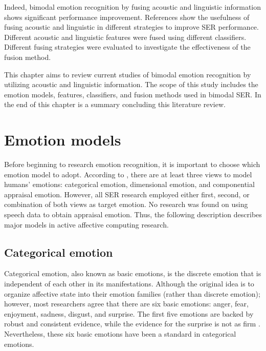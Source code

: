 Indeed, bimodal emotion recognition by fusing acoustic and linguistic
information shows significant performance improvement. References
\cite{Schuller2004,Schullera,Eyben2010,Ye2014,Tian2019} show the usefulness of
fusing acoustic and linguistic in different strategies to improve SER
performance. Different acoustic and linguistic features were fused using
different classifiers. Different fusing strategies were evaluated to
investigate the effectiveness of the fusion method.

This chapter aims to review current studies of bimodal emotion recognition by
utilizing acoustic and linguistic information. The scope of this study includes
the emotion models, features, classifiers, and fusion methods used in bimodal
SER. In the end of this chapter is a summary concluding this literature review.



\section{Emotion models}
Before beginning to research emotion recognition, it is important to choose
which emotion model to adopt. According to \cite{Grandjean2008}, there are at
least three views to model humans' emotions: categorical emotion, dimensional
emotion, and componential appraisal emotion. However, all SER research employed
either first, second, or combination of both views as target emotion.  No
research was found on using speech data to obtain appraisal emotion. Thus, the
following description describes major models in active affective computing
research. 

\subsection{Categorical emotion}
Categorical emotion, also known as basic emotions, is the discrete emotion that
is independent of each other in its manifestations. Although the original idea
is to organize affective state into their emotion families (rather than
discrete emotion); however, most researchers agree that there are six basic
emotions: anger, fear, enjoyment, sadness, disgust, and surprise. The first
five emotions are backed by robust and consistent evidence, while the evidence
for the surprise is not as firm \cite{Ekman1992}. Nevertheless, these six basic
emotions have been a standard in categorical emotions.

